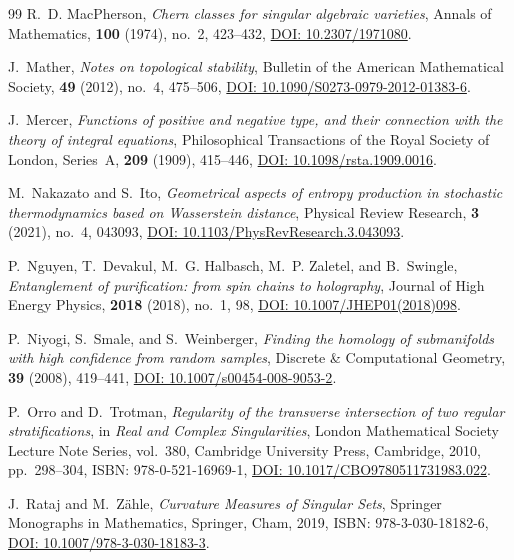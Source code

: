 \documentclass[11pt,a4paper,reqno]{amsart}
\theoremstyle{definition}
\theoremstyle{remark}
\numberwithin{equation}{section}
\begin{document}
\begin{thebibliography}{99}
R.~D. MacPherson,
\emph{Chern classes for singular algebraic varieties},
Annals of Mathematics, \textbf{100} (1974), no.~2, 423--432,
\href{https://doi.org/10.2307/1971080}{DOI: 10.2307/1971080}.

J.~Mather,
\emph{Notes on topological stability},
Bulletin of the American Mathematical Society, \textbf{49} (2012), no.~4, 475--506,
\href{https://doi.org/10.1090/S0273-0979-2012-01383-6}{DOI: 10.1090/S0273-0979-2012-01383-6}.

J.~Mercer,
\emph{Functions of positive and negative type, and their connection with the theory of integral equations},
Philosophical Transactions of the Royal Society of London, Series~A, \textbf{209} (1909), 415--446,
\href{https://doi.org/10.1098/rsta.1909.0016}{DOI: 10.1098/rsta.1909.0016}.

M.~Nakazato and S.~Ito,
\emph{Geometrical aspects of entropy production in stochastic thermodynamics based on Wasserstein distance},
Physical Review Research, \textbf{3} (2021), no.~4, 043093,
\href{https://doi.org/10.1103/PhysRevResearch.3.043093}{DOI: 10.1103/PhysRevResearch.3.043093}.

P.~Nguyen, T.~Devakul, M.~G. Halbasch, M.~P. Zaletel, and B.~Swingle,
\emph{Entanglement of purification: from spin chains to holography},
Journal of High Energy Physics, \textbf{2018} (2018), no.~1, 98,
\href{https://doi.org/10.1007/JHEP01(2018)098}{DOI: 10.1007/JHEP01(2018)098}.

P.~Niyogi, S.~Smale, and S.~Weinberger,
\emph{Finding the homology of submanifolds with high confidence from random samples},
Discrete \& Computational Geometry, \textbf{39} (2008), 419--441,
\href{https://doi.org/10.1007/s00454-008-9053-2}{DOI: 10.1007/s00454-008-9053-2}.

P.~Orro and D.~Trotman,
\emph{Regularity of the transverse intersection of two regular stratifications},
in \emph{Real and Complex Singularities}, London Mathematical Society Lecture Note Series, vol.~380, Cambridge University Press, Cambridge, 2010, pp.~298--304,
ISBN: 978-0-521-16969-1,
\href{https://doi.org/10.1017/CBO9780511731983.022}{DOI: 10.1017/CBO9780511731983.022}.

J.~Rataj and M.~Z\"ahle,
\emph{Curvature Measures of Singular Sets},
Springer Monographs in Mathematics, Springer, Cham, 2019,
ISBN: 978-3-030-18182-6,
\href{https://doi.org/10.1007/978-3-030-18183-3}{DOI: 10.1007/978-3-030-18183-3}.


\end{thebibliography}
\end{document}
